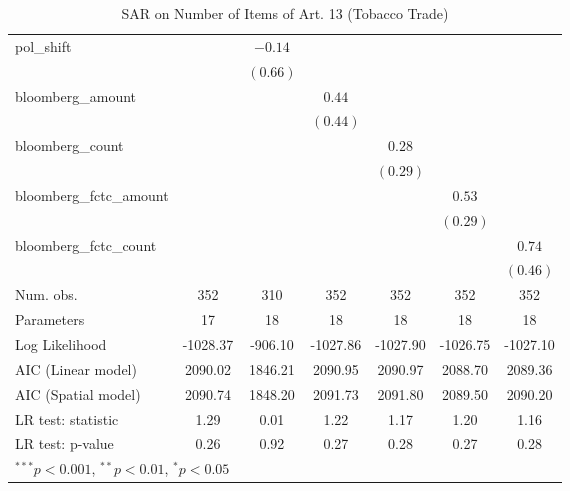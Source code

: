 \begin{table}[!h]
\begin{center}
\begin{tabular}{l c c c c c c }
pol\_shift              &              & $-0.14$      &              &              &              &              \\
                        &              & $(0.66)$     &              &              &              &              \\
bloomberg\_amount       &              &              & $0.44$       &              &              &              \\
                        &              &              & $(0.44)$     &              &              &              \\
bloomberg\_count        &              &              &              & $0.28$       &              &              \\
                        &              &              &              & $(0.29)$     &              &              \\
bloomberg\_fctc\_amount &              &              &              &              & $0.53$       &              \\
                        &              &              &              &              & $(0.29)$     &              \\
bloomberg\_fctc\_count  &              &              &              &              &              & $0.74$       \\
                        &              &              &              &              &              & $(0.46)$     \\
\midrule
Num. obs.               & 352          & 310          & 352          & 352          & 352          & 352          \\
Parameters              & 17           & 18           & 18           & 18           & 18           & 18           \\
Log Likelihood          & -1028.37     & -906.10      & -1027.86     & -1027.90     & -1026.75     & -1027.10     \\
AIC (Linear model)      & 2090.02      & 1846.21      & 2090.95      & 2090.97      & 2088.70      & 2089.36      \\
AIC (Spatial model)     & 2090.74      & 1848.20      & 2091.73      & 2091.80      & 2089.50      & 2090.20      \\
LR test: statistic      & 1.29         & 0.01         & 1.22         & 1.17         & 1.20         & 1.16         \\
LR test: p-value        & 0.26         & 0.92         & 0.27         & 0.28         & 0.27         & 0.28         \\
\bottomrule
\multicolumn{7}{l}{\scriptsize{$^{***}p<0.001$, $^{**}p<0.01$, $^*p<0.05$}}
\end{tabular}
\caption{SAR on Number of Items of Art. 13 (Tobacco Trade)}
\label{table:coefficients}
\end{center}
\end{table}
